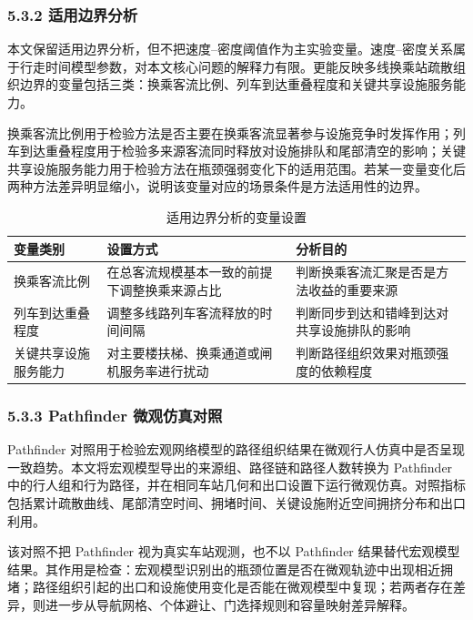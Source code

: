 \documentclass[UTF8,a4paper,12pt]{ctexart}
\begin{document}
\subsubsection{5.3.2 适用边界分析}

本文保留适用边界分析，但不把速度--密度阈值作为主实验变量。速度--密度关系属于行走时间模型参数，对本文核心问题的解释力有限。更能反映多线换乘站疏散组织边界的变量包括三类：换乘客流比例、列车到达重叠程度和关键共享设施服务能力。

换乘客流比例用于检验方法是否主要在换乘客流显著参与设施竞争时发挥作用；列车到达重叠程度用于检验多来源客流同时释放对设施排队和尾部清空的影响；关键共享设施服务能力用于检验方法在瓶颈强弱变化下的适用范围。若某一变量变化后两种方法差异明显缩小，说明该变量对应的场景条件是方法适用性的边界。

\begin{table}[htbp]
\centering
\caption{适用边界分析的变量设置}
\small
\begin{tabular}{p{}p{}p{}}
\toprule
变量类别 & 设置方式 & 分析目的 \\
\midrule
换乘客流比例 & 在总客流规模基本一致的前提下调整换乘来源占比 & 判断换乘客流汇聚是否是方法收益的重要来源 \\
列车到达重叠程度 & 调整多线路列车客流释放的时间间隔 & 判断同步到达和错峰到达对共享设施排队的影响 \\
关键共享设施服务能力 & 对主要楼扶梯、换乘通道或闸机服务率进行扰动 & 判断路径组织效果对瓶颈强度的依赖程度 \\
\bottomrule
\end{tabular}
\end{table}

\subsubsection{5.3.3 Pathfinder 微观仿真对照}

Pathfinder 对照用于检验宏观网络模型的路径组织结果在微观行人仿真中是否呈现一致趋势。本文将宏观模型导出的来源组、路径链和路径人数转换为 Pathfinder 中的行人组和行为路径，并在相同车站几何和出口设置下运行微观仿真。对照指标包括累计疏散曲线、尾部清空时间、拥堵时间、关键设施附近空间拥挤分布和出口利用。

该对照不把 Pathfinder 视为真实车站观测，也不以 Pathfinder 结果替代宏观模型结果。其作用是检查：宏观模型识别出的瓶颈位置是否在微观轨迹中出现相近拥堵；路径组织引起的出口和设施使用变化是否能在微观模型中复现；若两者存在差异，则进一步从导航网格、个体避让、门选择规则和容量映射差异解释。
\end{document}
